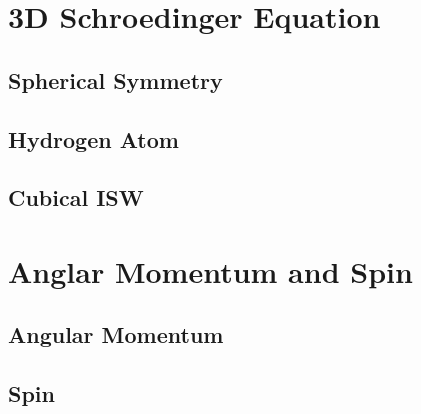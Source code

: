\section{3D Schroedinger Equation}
\subsection{Spherical Symmetry}
\subsection{Hydrogen Atom}
\subsection{Cubical ISW}

\section{Anglar Momentum and Spin}
\subsection{Angular Momentum}
\subsection{Spin}

